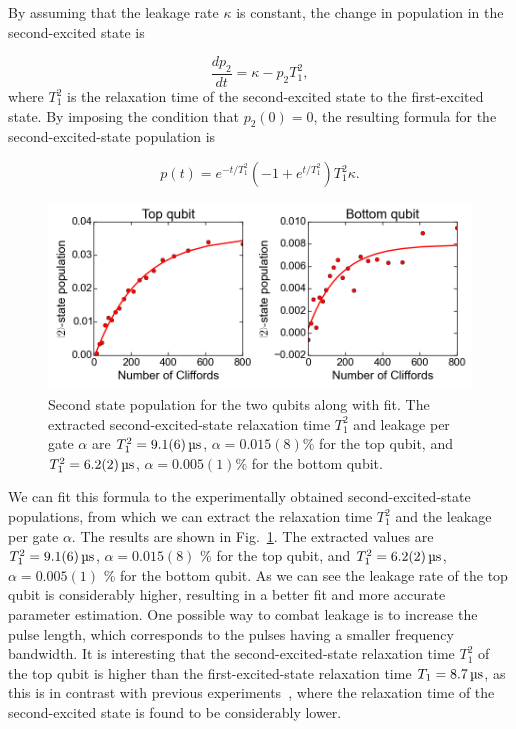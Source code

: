         By assuming that the leakage rate $\kappa$ is constant, the change in population in the second-excited state is

        \begin{equation}
          \frac{d p_2}{d t}= \kappa - p_2 T_1^2,
        \end{equation}
        where $T_1^2$ is the relaxation time of the second-excited state to the first-excited state. By imposing the condition that $p_2(0)=0$, the resulting formula for the second-excited-state population is

        \begin{equation}
          p(t) = e^{-t/{T_1^2}}\left(  -1 + e^{t/{T_1^2}}\right)T_1^2 \kappa.
          \label{eq:2nd state formula}
        \end{equation}
        \begin{figure}[tb]
          \centering
          \includegraphics[width=\textwidth]{Figures/Randomized benchmarking/2nd-state leakage normal.png}
          \caption{Second state population for the two qubits along with fit. The extracted second-excited-state relaxation time $T_1^2$ and leakage per gate $\alpha$ are $T_1^2=\SIm{9.1(6)}{\micro \second}$, $\alpha=0.015(8)\%$ for the top qubit, and $T_1^2=\SIm{6.2(2)}{\micro \second}$, $\alpha=0.005(1)\%$ for the bottom qubit.}
          \label{fig:2nd-state leakage normal}
        \end{figure}
        We can fit this formula to the experimentally obtained second-excited-state populations, from which we can extract the relaxation time $T_1^2$ and the leakage per gate $\alpha$. The results are shown in Fig.~\ref{fig:2nd-state leakage normal}. The extracted values are $T_1^2=\SIm{9.1(6)}{\micro \second}$, $\alpha=0.015(8)$ \% for the top qubit, and $T_1^2=\SIm{6.2(2)}{\micro \second}$, $\alpha=0.005(1)$ \% for the bottom qubit. As we can see the leakage rate of the top qubit is considerably higher, resulting in a better fit and more accurate parameter estimation. One possible way to combat leakage is to increase the pulse length, which corresponds to the pulses having a smaller frequency bandwidth. It is interesting that the second-excited-state relaxation time $T_1^2$ of the top qubit is higher than the first-excited-state relaxation time $T_1=\SIm{8.7}{\micro \second}$, as this is in contrast with previous experiments~\cite{peterer2015coherence}, where the relaxation time of the second-excited state is found to be considerably lower.



